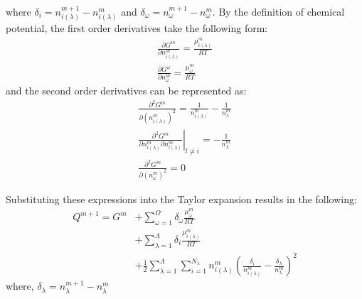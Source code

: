 	where $\delta_i  = n_{i(\lambda)}^{m+1} - n_{i(\lambda)}^m$ and $\delta_{\omega}  = n_{\omega}^{m+1} - n_{\omega}^m$. By the definition of chemical potential, the first order derivatives take the following form:
	\begin{gather}
		\frac{\partial G^m}{\partial n_{i(\lambda)}^{m}} = \frac{\mu_{i(\lambda)}^{m}}{RT} \\
		\frac{\partial G^{\omega}}{\partial n_{\omega}^{m}} = \frac{\mu_{\omega}^{m}}{RT} 
	\end{gather}
	and the second order derivatives can be represented as:
	\begin{gather}
		\frac{\partial^2 G^m}{\partial \left(n_{i(\lambda)}^{m}\right)^2} = \frac{1}{n_{i(\lambda)}^{m}} - \frac{1}{n_{\lambda}^{m}}\\
		\left. \frac{\partial^2 G^m}{\partial n_{i(\lambda)}^{m} \partial n_{l(\lambda)}^{m}}\right\vert_{l\neq i} =  - \frac{1}{n_{\lambda}^{m}} \\
		\frac{\partial^2 G^m}{\partial \left(n_{\omega}^{m}\right)^2} = 0
	\end{gather}
	
	Substituting these expressions into the Taylor expansion results in the following:
	\begin{equation}\label{eq:Taylor_Obj}
		\begin{aligned}
		Q^{m+1} = G^m &+  \sum_{\omega=1}^{\Omega} \delta_{\omega} \frac{\mu_{\omega}^{m}}{RT}\\
				&+ \sum_{\lambda=1}^{\Lambda} \delta_{i} \frac{\mu_{i(\lambda)}^m}{RT}\\
				&+ \frac{1}{2} \sum_{\lambda=1}^{\Lambda} \sum_{i=1}^{N_{\lambda}} n_{i(\lambda)}^{m} \left(\frac{\delta_i}{n_{i(\lambda)}^{m}} - \frac{\delta_{\lambda}}{n_{\lambda}^{m}} \right)^2
		\end{aligned}
	\end{equation}
	where, $\delta_{\lambda} = n_{\lambda}^{m+1} - n_{\lambda}^m$
	 
